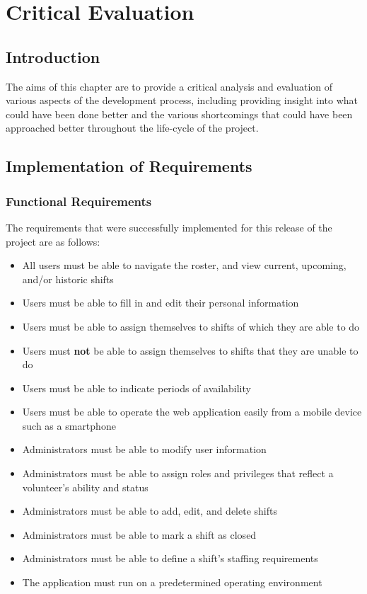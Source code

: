 \chapter{Critical Evaluation}

\section{Introduction}
The aims of this chapter are to provide a critical analysis and evaluation of various aspects of the development process, including providing insight into what could have been done better and the various shortcomings that could have been approached better throughout the life-cycle of the project. 

\section{Implementation of Requirements}

\subsection{Functional Requirements}
The requirements that were successfully implemented for this release of the project are as follows:

\begin{itemize}
    \item All users must be able to navigate the roster, and view current, upcoming, and/or historic shifts
    \item Users must be able to fill in and edit their personal information
    \item Users must be able to assign themselves to shifts of which they are able to do
    \item Users must \textbf{not} be able to assign themselves to shifts that they are unable to do
    \item Users must be able to indicate periods of availability
    \item Users must be able to operate the web application easily from a mobile device such as a smartphone
    \item Administrators must be able to modify user information
    \item Administrators must be able to assign roles and privileges that reflect a volunteer's ability and status
    \item Administrators must be able to add, edit, and delete shifts
    \item Administrators must be able to mark a shift as closed
    \item Administrators must be able to define a shift's staffing requirements
    \item The application must run on a predetermined operating environment
\end{itemize}

